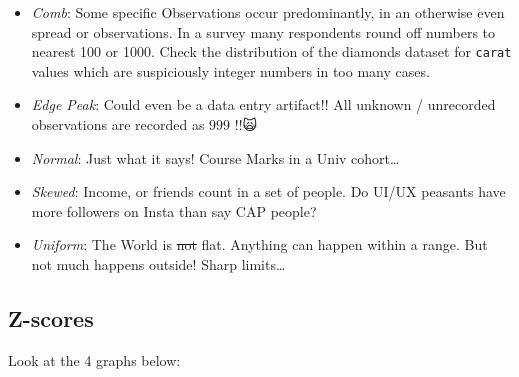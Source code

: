 \documentclass[
  letterpaper,
  DIV=11,
  numbers=noendperiod,
  oneside]{scrartcl}
\providecommand{\tightlist}{%
  \setlength{\itemsep}{0pt}\setlength{\parskip}{0pt}}
\begin{document}
\begin{itemize}
\tightlist
\item
  \emph{Comb}: Some specific Observations occur predominantly, in an
  otherwise even spread or observations. In a survey many respondents
  round off numbers to nearest 100 or 1000. Check the distribution of
  the diamonds dataset for \texttt{carat} values which are suspiciously
  integer numbers in too many cases.\\
\item
  \emph{Edge Peak}: Could even be a data entry artifact!! All unknown /
  unrecorded observations are recorded as \(999\) !!🙀\\
\item
  \emph{Normal}: Just what it says! Course Marks in a Univ
  cohort\ldots{}\\
\item
  \emph{Skewed}: Income, or friends count in a set of people. Do UI/UX
  peasants have more followers on Insta than say CAP people?\\
\item
  \emph{Uniform}: The World is \st{not} flat. Anything can happen within
  a range. But not much happens outside! Sharp limits\ldots{}
\end{itemize}

\subsection{\texorpdfstring{ Z-scores}{ Z-scores}}\label{z-scores}

Look at the 4 graphs below:
\end{document}
